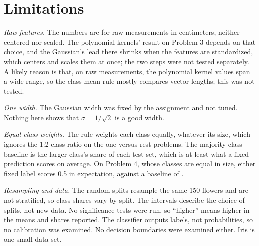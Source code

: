 \section{Limitations}

\emph{Raw features.} The numbers are for raw measurements in centimeters, neither centered nor scaled. The polynomial kernels' result on Problem 3 depends on that choice, and the Gaussian's lead there shrinks when the features are standardized, which centers and scales them at once; the two steps were not tested separately. A likely reason is that, on raw measurements, the polynomial kernel values span a wide range, so the class-mean rule mostly compares vector lengths; this was not tested.

\emph{One width.} The Gaussian width was fixed by the assignment and not tuned. Nothing here shows that $\sigma = 1/\sqrt{2}$ is a good width.

\emph{Equal class weights.} The rule weights each class equally, whatever its size, which ignores the 1:2 class ratio on the one-versus-rest problems. The majority-class baseline is the larger class's share of each test set, which is at least what a fixed prediction scores on average. On Problem 4, whose classes are equal in size, either fixed label scores 0.5 in expectation, against a baseline of .

\emph{Resampling and data.} The random splits resample the same 150 flowers and are not stratified, so class shares vary by split. The intervals describe the choice of splits, not new data. No significance tests were run, so ``higher'' means higher in the means and shares reported. The classifier outputs labels, not probabilities, so no calibration was examined. No decision boundaries were examined either. Iris is one small data set.
